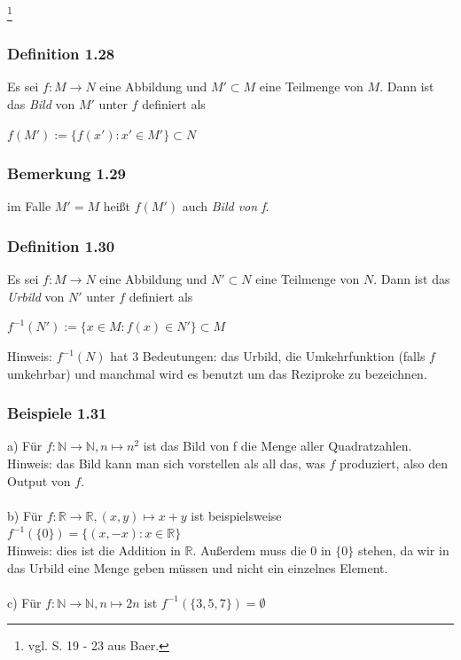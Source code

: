 \documentclass{article}
\begin{document}
\date{Donnerstag, 26.10.23} \footnote{vgl. S. 19 - 23 aus Baer.}

\subsubsection*{Definition 1.28}
Es sei $f: M \rightarrow N$ eine Abbildung und $M' \subset M$ eine Teilmenge von $M$. Dann ist das \textit{Bild} von $M'$ unter $f$ definiert als
\begin{center}
    $f(M') := \{f(x'): x' \in M'\} \subset N$
\end{center}

\subsubsection*{Bemerkung 1.29}
im Falle $M' = M$ heißt $f(M')$ auch \textit{Bild von f}. 

\subsubsection*{Definition 1.30}
Es sei $f: M \rightarrow N$ eine Abbildung und $N' \subset N$ eine Teilmenge von $N$. Dann ist das \textit{Urbild} von $N'$ unter $f$ definiert als
\begin{center}
    $f^{-1}(N') := \{x \in M: f(x) \in N'\} \subset M$
\end{center}
Hinweis: $f^{-1}(N)$ hat 3 Bedeutungen: das Urbild, die Umkehrfunktion (falls $f$ umkehrbar) und manchmal wird es benutzt um das Reziproke zu bezeichnen.

\subsubsection*{Beispiele 1.31}
a) Für $f: \mathbb{N} \rightarrow \mathbb{N}, n \mapsto n^2$ ist das Bild von f die Menge aller Quadratzahlen. \\
Hinweis: das Bild kann man sich vorstellen als all das, was $f$ produziert, also den Output von $f$.\\
\\
b) Für $f: \mathbb{R} \rightarrow \mathbb{R}, (x, y) \mapsto x + y$ ist beispielsweise $f^{-1}(\{0\})= \{(x, -x): x \in \mathbb{R}\}$ \\
Hinweis: dies ist die Addition in $\mathbb{R}$. Außerdem muss die $0$ in $\{0\}$ stehen, da wir in das Urbild eine Menge geben müssen und nicht ein einzelnes Element. \\
\\
c) Für $f: \mathbb{N} \rightarrow \mathbb{N}, n \mapsto 2n$ ist $f^{-1}(\{3 ,5 ,7 \}) = \emptyset$ 
\end{document}
